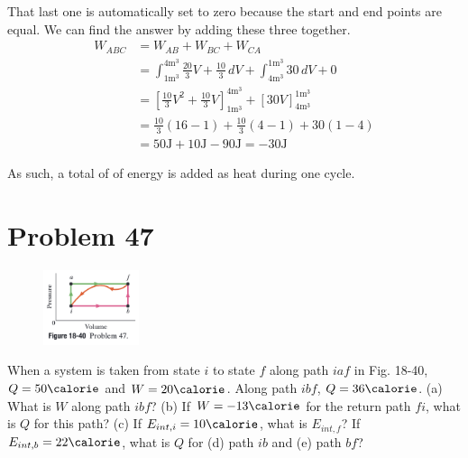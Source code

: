 \documentclass[12pt]{article}
\begin{document}
        That last one is automatically set to zero because the start and end points are equal.
        We can find the answer by adding these three together.
        \begin{align}
            W_{ABC} &=  W_{AB} + W_{BC} + W_{CA}\\
                &=  \int_{1\unit{\meter^3}}^{4\unit{\meter^3}} \frac{20}{3}V + \frac{10}{3} \,dV + \int_{4\unit{\meter^3}}^{1\unit{\meter^3}} 30 \,dV + 0\\
                &=  \left[ \frac{10}{3}V^2 + \frac{10}{3}V \right]_{1\unit{\meter^3}}^{4\unit{\meter^3}} + \left[ 30V \right]_{4\unit{\meter^3}}^{1\unit{\meter^3}}\\
                &=  \frac{10}{3}(16 - 1) + \frac{10}{3}(4 - 1) + 30(1 - 4)\\
                &=  50 \unit{\joule} + 10 \unit{\joule} - 90 \unit{\joule}
                =   -30 \unit{\joule}
        \end{align}

        As such, a total of \boxed{-30 \unit{\joule}} of energy is added as heat during one cycle.

    \pagebreak
    \section{Problem 47}
        \begin{figure}
            \vspace{-30pt}
            \includegraphics[width=0.25\textwidth]{picture_18-40.png} 
        \end{figure}
        When a system is taken from state $i$ to state $f$ along path $iaf$ in Fig. 18-40, $Q = 50 \unit{\calorie}$ and $W = 20 \unit{\calorie}$. 
        Along path $ibf$, $Q = 36 \unit{\calorie}$. 
        (a) What is $W$ along path $ibf$? 
        (b) If $W = -13 \unit{\calorie}$ for the return path $fi$, what is $Q$ for this path? 
        (c) If $E_{int,i} = 10 \unit{\calorie}$, what is $E_{int,f}$? 
        If $E_{int,b} = 22 \unit{\calorie}$, what is $Q$ for (d) path $ib$ and (e) path $bf$?
\end{document}

